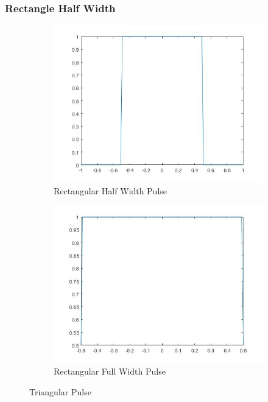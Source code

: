 \documentclass{article}
\begin{document}
\subsubsection{Rectangle Half Width}
\begin{figure}[H]
  \begin{center}
    \begin{subfigure}[b]{0.4\linewidth}
      \includegraphics[width = \linewidth]{Rect_Half.jpg}
      \caption{Rectangular Half Width Pulse}
    \end{subfigure}
    \begin{subfigure}[b]{0.4\linewidth}
      \includegraphics[width = \linewidth]{Rect_Full.jpg}
      \caption{Rectangular Full Width Pulse}
    \end{subfigure}
    \caption{Triangular Pulse}
    \label{fig:Rect}
  \end{center}
\end{figure}
\end{document}
